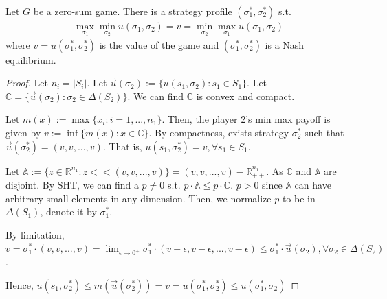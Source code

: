 \documentclass[11pt]{elegantbook}
\begin{document}
\begin{theorem}
    Let $G$ be a zero-sum game. There is a strategy profile $(\sigma_1^*, \sigma_2^*)$ s.t.
    \begin{equation}
        \begin{aligned}
            \max_{\sigma_1}\min_{\sigma_2}u(\sigma_1,\sigma_2)=v= \min_{\sigma_2}\max_{\sigma_1}u(\sigma_1,\sigma_2)
        \end{aligned}
        \nonumber
    \end{equation}
    where $v=u(\sigma_1^*, \sigma_2^*)$ is the value of the game and $(\sigma_1^*, \sigma_2^*)$ is a Nash equilibrium.
\end{theorem}
\begin{proof}
    Let $n_i=|S_i|$. Let $\vec{u}(\sigma_2):=\{u(s_1,\sigma_2):s_1\in S_1\}$. Let $\mathbb{C}=\{\vec{u}(\sigma_2):\sigma_2\in \Delta(S_2)\}$. We can find $\mathbb{C}$ is convex and compact.

    Let $m(x):=\max\{x_i:i=1,...,n_1\}$. Then, the player 2's min max payoff is given by $v:=\inf\{m(x):x\in \mathbb{C}\}$. By compactness, exists strategy $\sigma_2^*$ such that $\vec{u}(\sigma_2^*)=(v,v,...,v)$. That is, $u(s_1,\sigma_2^*)=v,\forall s_1\in S_1$.

    Let $\mathbb{A}:=\{z\in \mathbb{R}^{n_1}:z<<(v,v,...,v)\}=(v,v,...,v)-\mathbb{R}^{n_1}_{++}$. As $\mathbb{C}$ and $\mathbb{A}$ are disjoint. By SHT, we can find a $p\neq 0$ s.t. $p\cdot \mathbb{A}\leq p\cdot \mathbb{C}$. $p>0$ since $\mathbb{A}$ can have arbitrary small elements in any dimension. Then, we normalize $p$ to be in $\Delta(S_1)$, denote it by $\sigma^*_1$.

    By limitation, $v=\sigma^*_1\cdot(v,v,...,v)=\lim_{\epsilon \rightarrow 0^+}\sigma^*_1\cdot (v-\epsilon,v-\epsilon,...,v-\epsilon)\leq \sigma^*_1\cdot\vec{u}(\sigma_2),\forall \sigma_2\in \Delta(S_2)$.

    Hence, $u(s_1,\sigma_2^*)\leq m(\vec{u}(\sigma_2^*))=v=u(\sigma_1^*,\sigma_2^*)\leq u(\sigma_1^*,\sigma_2)$
\end{proof}
\end{document}
